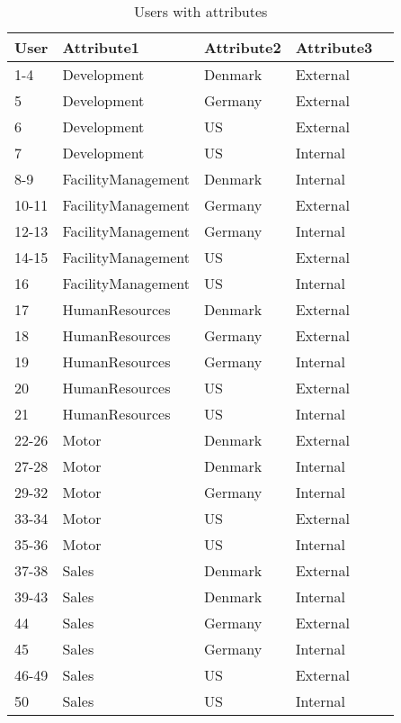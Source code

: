 		\begin{table}[H]
			\centering
			\caption{Users with attributes}
			\label{tab:dataset2_users}
			\begin{tabular}{|l|l|l|l|l|}
				\hline
				\rowcolor[HTML]{EFEFEF} 
				User  & Attribute1         & Attribute2 & Attribute3   \\ \hline
				1-4   & Development        & Denmark    & External     \\ \hline
				5     & Development        & Germany    & External     \\ \hline
				6     & Development        & US         & External     \\ \hline
				7     & Development        & US         & Internal     \\ \hline
				8-9   & FacilityManagement & Denmark    & Internal     \\ \hline
				10-11 & FacilityManagement & Germany    & External     \\ \hline
				12-13 & FacilityManagement & Germany    & Internal     \\ \hline
				14-15 & FacilityManagement & US         & External     \\ \hline
				16    & FacilityManagement & US         & Internal     \\ \hline
				17    & HumanResources     & Denmark    & External     \\ \hline
				18    & HumanResources     & Germany    & External     \\ \hline
				19    & HumanResources     & Germany    & Internal     \\ \hline
				20    & HumanResources     & US         & External     \\ \hline
				21    & HumanResources     & US         & Internal     \\ \hline
				22-26 & Motor              & Denmark    & External     \\ \hline
				27-28 & Motor              & Denmark    & Internal     \\ \hline
				29-32 & Motor              & Germany    & Internal     \\ \hline
				33-34 & Motor              & US         & External     \\ \hline
				35-36 & Motor              & US         & Internal     \\ \hline
				37-38 & Sales              & Denmark    & External     \\ \hline
				39-43 & Sales              & Denmark    & Internal     \\ \hline
				44    & Sales              & Germany    & External     \\ \hline
				45    & Sales              & Germany    & Internal     \\ \hline
				46-49 & Sales              & US         & External     \\ \hline
				50    & Sales              & US         & Internal     \\ \hline
			\end{tabular}
		\end{table}
	
